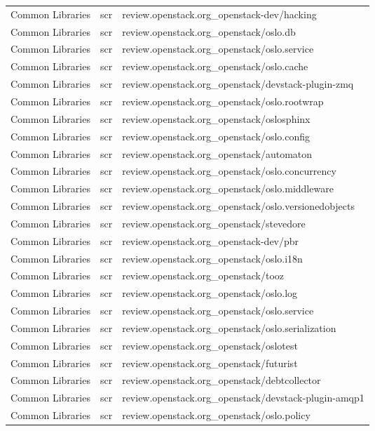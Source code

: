 \begin{center}
\begin{longtable}{|p{4cm}|p{1cm}|p{10cm}|}
Common Libraries&scr&review.openstack.org\_openstack-dev/hacking\\ 
Common Libraries&scr&review.openstack.org\_openstack/oslo.db\\ 
Common Libraries&scr&review.openstack.org\_openstack/oslo.service\\ 
Common Libraries&scr&review.openstack.org\_openstack/oslo.cache\\ 
Common Libraries&scr&review.openstack.org\_openstack/devstack-plugin-zmq\\ 
Common Libraries&scr&review.openstack.org\_openstack/oslo.rootwrap\\ 
Common Libraries&scr&review.openstack.org\_openstack/oslosphinx\\ 
Common Libraries&scr&review.openstack.org\_openstack/oslo.config\\ 
Common Libraries&scr&review.openstack.org\_openstack/automaton\\ 
Common Libraries&scr&review.openstack.org\_openstack/oslo.concurrency\\ 
Common Libraries&scr&review.openstack.org\_openstack/oslo.middleware\\ 
Common Libraries&scr&review.openstack.org\_openstack/oslo.versionedobjects\\ 
Common Libraries&scr&review.openstack.org\_openstack/stevedore\\ 
Common Libraries&scr&review.openstack.org\_openstack-dev/pbr\\ 
Common Libraries&scr&review.openstack.org\_openstack/oslo.i18n\\ 
Common Libraries&scr&review.openstack.org\_openstack/tooz\\ 
Common Libraries&scr&review.openstack.org\_openstack/oslo.log\\ 
Common Libraries&scr&review.openstack.org\_openstack/oslo.service\\ 
Common Libraries&scr&review.openstack.org\_openstack/oslo.serialization\\ 
Common Libraries&scr&review.openstack.org\_openstack/oslotest\\ 
Common Libraries&scr&review.openstack.org\_openstack/futurist\\ 
Common Libraries&scr&review.openstack.org\_openstack/debtcollector\\ 
Common Libraries&scr&review.openstack.org\_openstack/devstack-plugin-amqp1\\ 
Common Libraries&scr&review.openstack.org\_openstack/oslo.policy\\ 

\end{longtable}
\end{center}
